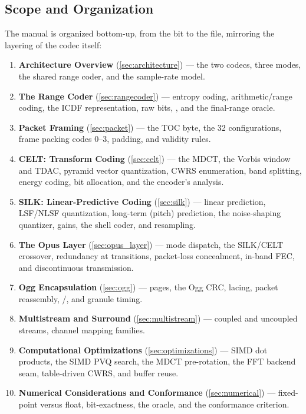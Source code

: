 \subsection{Scope and Organization}\label{subsec:organization}

The manual is organized bottom-up, from the bit to the file, mirroring the
layering of the codec itself:

\begin{enumerate}[itemsep=3pt]
  \item \textbf{Architecture Overview} (\cref{sec:architecture}) --- the two
    codecs, three modes, the shared range coder, and the sample-rate model.
  \item \textbf{The Range Coder} (\cref{sec:rangecoder}) --- entropy coding,
    arithmetic/range coding, the ICDF representation, raw bits, ,
    and the final-range oracle.
  \item \textbf{Packet Framing} (\cref{sec:packet}) --- the TOC byte, the 32
    configurations, frame packing codes 0--3, padding, and validity rules.
  \item \textbf{CELT: Transform Coding} (\cref{sec:celt}) --- the MDCT, the
    Vorbis window and TDAC, pyramid vector quantization, CWRS enumeration, band
    splitting, energy coding, bit allocation, and the encoder's analysis.
  \item \textbf{SILK: Linear-Predictive Coding} (\cref{sec:silk}) --- linear
    prediction, LSF/NLSF quantization, long-term (pitch) prediction, the
    noise-shaping quantizer, gains, the shell coder, and resampling.
  \item \textbf{The Opus Layer} (\cref{sec:opus_layer}) --- mode dispatch,
    the SILK/CELT crossover, redundancy at transitions, packet-loss
    concealment, in-band FEC, and discontinuous transmission.
  \item \textbf{Ogg Encapsulation} (\cref{sec:ogg}) --- pages, the Ogg CRC,
    lacing, packet reassembly, /, and granule
    timing.
  \item \textbf{Multistream and Surround} (\cref{sec:multistream}) --- coupled
    and uncoupled streams, channel mapping families.
  \item \textbf{Computational Optimizations} (\cref{sec:optimizations}) ---
    SIMD dot products, the SIMD PVQ search, the MDCT pre-rotation, the FFT
    backend seam, table-driven CWRS, and buffer reuse.
  \item \textbf{Numerical Considerations and Conformance}
    (\cref{sec:numerical}) --- fixed-point versus float, bit-exactness, the
    oracle, and the conformance criterion.
\end{enumerate}

